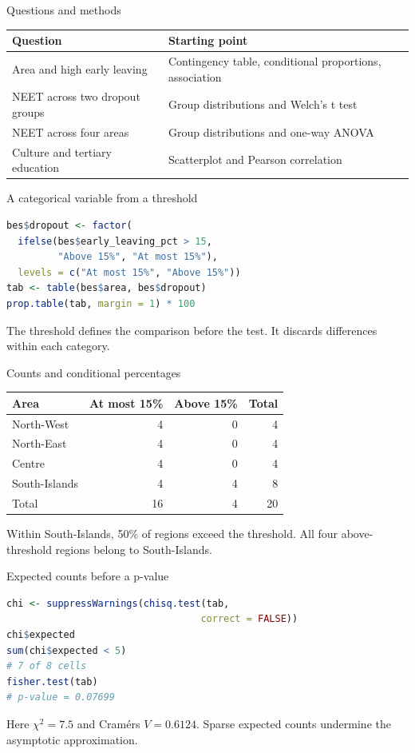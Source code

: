 \begin{frame}{Questions and methods}
\small\begin{tabular}{p{}p{}}\toprule
\textbf{Question} & \textbf{Starting point}\\\midrule
Area and high early leaving & Contingency table, conditional proportions, association\\[3mm]
NEET across two dropout groups & Group distributions and Welch's t test\\[3mm]
NEET across four areas & Group distributions and one-way ANOVA\\[3mm]
Culture and tertiary education & Scatterplot and Pearson correlation\\\bottomrule\end{tabular}
\end{frame}

\begin{frame}[fragile]{A categorical variable from a threshold}
\begin{lstlisting}[language=R]
bes$dropout <- factor(
  ifelse(bes$early_leaving_pct > 15,
         "Above 15%", "At most 15%"),
  levels = c("At most 15%", "Above 15%"))
tab <- table(bes$area, bes$dropout)
prop.table(tab, margin = 1) * 100
\end{lstlisting}
The threshold defines the comparison before the test. It discards differences within each category.
\end{frame}

\begin{frame}{Counts and conditional percentages}
\begin{center}\begin{tabular}{lrrr}\toprule
Area & At most 15\% & Above 15\% & Total\\\midrule
North-West & 4 & 0 & 4\\
North-East & 4 & 0 & 4\\
Centre & 4 & 0 & 4\\
South-Islands & 4 & 4 & 8\\\midrule
Total & 16 & 4 & 20\\\bottomrule\end{tabular}\end{center}
Within South-Islands, 50\% of regions exceed the threshold. All four above-threshold regions belong to South-Islands.
\end{frame}

\begin{frame}[fragile]{Expected counts before a p-value}
\begin{lstlisting}[language=R]
chi <- suppressWarnings(chisq.test(tab,
                                  correct = FALSE))
chi$expected
sum(chi$expected < 5)
# 7 of 8 cells
fisher.test(tab)
# p-value = 0.07699
\end{lstlisting}
Here $\chi^2=7.5$ and Cram\'{e}r\textquotesingle s $V=0.6124$. Sparse expected counts undermine the asymptotic approximation.
\end{frame}

